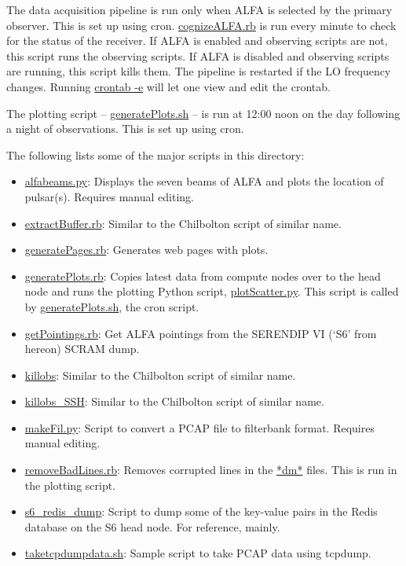 \documentclass{article}
\begin{document}
The data acquisition pipeline is run only when ALFA is selected by the primary
observer. This is set up using cron. \url{cognizeALFA.rb} is run every minute
to check for the status of the receiver. If ALFA is enabled and observing
scripts are not, this script runs the observing scripts. If ALFA is disabled
and observing scripts are running, this script kills them. The pipeline is
restarted if the LO frequency changes. Running \url{crontab -e} will let one
view and edit the crontab.

The plotting script -- \url{generatePlots.sh} -- is run at 12:00 noon on the
day following a night of observations. This is set up using cron.

The following lists some of the major scripts in this directory:

\begin{itemize}
\item \url{alfabeams.py}: Displays the seven beams of ALFA and plots the
location of pulsar(s). Requires manual editing.
\item \url{extractBuffer.rb}: Similar to the Chilbolton script of similar name.
\item \url{generatePages.rb}: Generates web pages with plots.
\item \url{generatePlots.rb}: Copies latest data from compute nodes over to the
head node and runs the plotting Python script, \url{plotScatter.py}. This
script is called by \url{generatePlots.sh}, the cron script.
\item \url{getPointings.rb}: Get ALFA pointings from the SERENDIP VI (`S6' from
hereon) SCRAM dump.
\item \url{killobs}: Similar to the Chilbolton script of similar name.
\item \url{killobs_SSH}: Similar to the Chilbolton script of similar name.
\item \url{makeFil.py}: Script to convert a PCAP file to filterbank format.
Requires manual editing.
\item \url{removeBadLines.rb}: Removes corrupted lines in the \url{*dm*} files.
This is run in the plotting script.
\item \url{s6_redis_dump}: Script to dump some of the key-value pairs in the
Redis database on the S6 head node. For reference, mainly.
\item \url{taketcpdumpdata.sh}: Sample script to take PCAP data using tcpdump.
\end{itemize}
\end{document}
